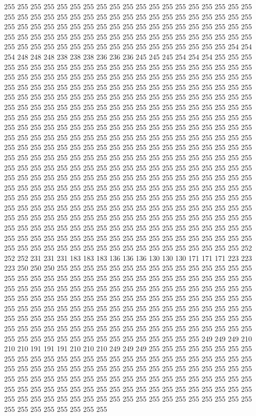 255 255 255 255 255 255 255 255 255 255 255 255 255 255 255 255 255 255 255 255 255 255 255 255 255 255 255 255 255 255 255 255 255 255 255 255 255 255 255 255 255 255 255 255 255 255 255 255 255 255 255 255 255 255 255 255 255 255 255 255 255 255 255 255 255 255 255 255 255 255 255 255 255 255 255 255 255 255 255 255 255 255 255 255 255 255 255 255 255 255 255 255 255 254 254 254 248 248 248 238 238 238 236 236 236 245 245 245 254 254 254 255 255 255 255 255 255 255 255 255 255 255 255 255 255 255 255 255 
255 255 255 255 255 255 255 255 255 255 255 255 255 255 255 255 255 255 255 255 255 255 255 255 255 255 255 255 255 255 255 255 255 255 255 255 255 255 255 255 255 255 255 255 255 255 255 255 255 255 255 255 255 255 255 255 255 255 255 255 255 255 255 255 255 255 255 255 255 255 255 255 255 255 255 255 255 255 255 255 255 255 255 255 255 255 255 255 255 255 255 255 255 255 255 255 255 255 255 255 255 255 255 255 255 255 255 255 255 255 255 255 255 255 255 255 255 255 255 255 255 255 255 255 255 255 255 255 
255 255 255 255 255 255 255 255 255 255 255 255 255 255 255 255 255 255 255 255 255 255 255 255 255 255 255 255 255 255 255 255 255 255 255 255 255 255 255 255 255 255 255 255 255 255 255 255 255 255 255 255 255 255 255 255 255 255 255 255 255 255 255 255 255 255 255 255 255 255 255 255 255 255 255 255 255 255 255 255 255 255 255 255 255 255 255 255 255 255 255 255 255 255 255 255 255 255 255 255 255 255 255 255 255 255 255 255 255 255 255 255 255 255 255 255 255 255 255 255 255 255 255 255 255 255 255 255 
255 255 255 255 255 255 255 255 255 255 255 255 255 255 255 255 255 255 255 255 255 255 255 255 255 255 255 255 255 255 255 255 255 255 255 255 255 255 255 255 255 255 255 255 255 255 255 255 255 255 255 255 255 255 255 255 255 255 255 255 255 255 255 255 255 255 255 255 255 255 255 255 255 255 255 255 255 255 255 255 255 255 255 255 255 255 255 255 255 255 252 252 252 231 231 231 183 183 183 136 136 136 130 130 130 171 171 171 223 223 223 250 250 250 255 255 255 255 255 255 255 255 255 255 255 255 255 255 
255 255 255 255 255 255 255 255 255 255 255 255 255 255 255 255 255 255 255 255 255 255 255 255 255 255 255 255 255 255 255 255 255 255 255 255 255 255 255 255 255 255 255 255 255 255 255 255 255 255 255 255 255 255 255 255 255 255 255 255 255 255 255 255 255 255 255 255 255 255 255 255 255 255 255 255 255 255 255 255 255 255 255 255 255 255 255 255 255 255 255 255 255 255 255 255 255 255 255 255 255 255 255 255 255 255 255 255 255 255 255 255 255 255 255 255 255 255 255 255 255 255 255 255 255 255 255 255 
255 255 249 249 249 210 210 210 191 191 191 210 210 210 249 249 249 255 255 255 255 255 255 255 255 255 255 255 255 255 255 255 255 255 255 255 255 255 255 255 255 255 255 255 255 255 255 255 255 255 255 255 255 255 255 255 255 255 255 255 255 255 255 255 255 255 255 255 255 255 255 255 255 255 255 255 255 255 255 255 255 255 255 255 255 255 255 255 255 255 255 255 255 255 255 255 255 255 255 255 255 255 255 255 255 255 255 255 255 255 255 255 255 255 255 255 255 255 255 255 255 255 255 255 255 255 255 255 
